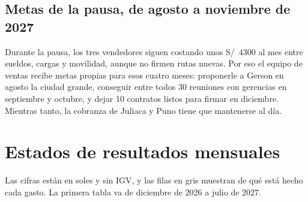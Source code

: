 \documentclass[10.5pt,a4paper]{article}
\begin{document}
\subsection{Metas de la pausa, de agosto a noviembre de 2027}

Durante la pausa, los tres vendedores siguen costando unos S/~4300 al mes entre sueldos, cargas y movilidad, aunque no firmen rutas nuevas. Por eso el equipo de ventas recibe metas propias para esos cuatro meses: proponerle a Gerson en agosto la ciudad grande, conseguir entre todos 30 reuniones con gerencias en septiembre y octubre, y dejar 10 contratos listos para firmar en diciembre. Mientras tanto, la cobranza de Juliaca y Puno tiene que mantenerse al día.

\newpage
\section{Estados de resultados mensuales}

Las cifras están en soles y sin IGV, y las filas en gris muestran de qué está hecho cada gasto. La primera tabla va de diciembre de 2026 a julio de 2027.
\end{document}
